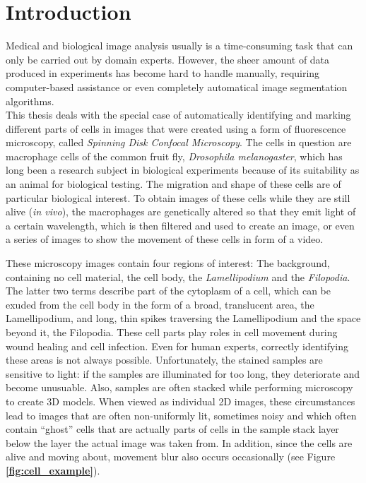 \chapter{Introduction}
Medical and biological image analysis usually is a time-consuming task that can only be carried out by domain experts. However, the sheer amount of data produced in experiments has become hard to handle manually, requiring computer-based assistance or even completely automatical image segmentation algorithms.\\

\noindent This thesis deals with the special case of automatically identifying and marking different parts of cells in images that were created using a form of fluorescence microscopy, called \textit{Spinning Disk Confocal Microscopy}. The cells in question are macrophage cells of the common fruit fly, \textit{Drosophila melanogaster}, which has long been a research subject in biological experiments because of its suitability as an animal for biological testing. The migration and shape of these cells are of particular biological interest. To obtain images of these cells while they are still alive (\textit{in vivo}), the macrophages are genetically altered so that they emit light of a certain wavelength, which is then filtered and used to create an image, or even a series of images to show the movement of these cells in form of a video.

These microscopy images contain four regions of interest: The background, containing no cell material, the cell body, the \textit{Lamellipodium} and the \textit{Filopodia}. The latter two terms describe part of the cytoplasm of a cell, which can be exuded from the cell body in the form of a broad, translucent area, the Lamellipodium, and long, thin spikes traversing the Lamellipodium and the space beyond it, the Filopodia. These cell parts play roles in cell movement during wound healing and cell infection. Even for human experts, correctly identifying these areas is not always possible. Unfortunately, the stained samples are sensitive to light: if the samples are illuminated for too long, they deteriorate and become unusuable. Also, samples are often stacked while performing microscopy to create 3D models. When viewed as individual 2D images, these circumstances lead to images that are often non-uniformly lit, sometimes noisy and which often contain ``ghost'' cells that are actually parts of cells in the sample stack layer below the layer the actual image was taken from. In addition, since the cells are alive and moving about, movement blur also occurs occasionally (see Figure \textbf{\ref{fig:cell_example}}). \cite{bioimage, bioimage2}


